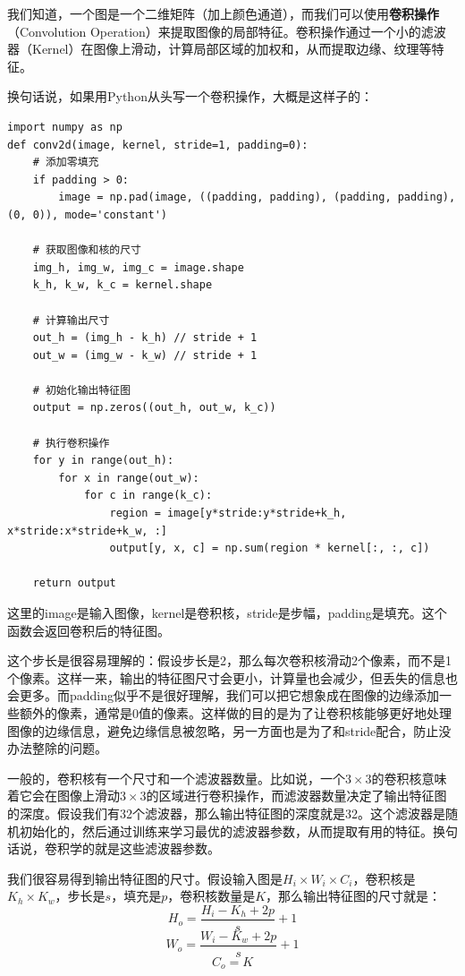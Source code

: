 我们知道，一个图是一个二维矩阵（加上颜色通道），而我们可以使用\textbf{卷积操作}（Convolution Operation）来提取图像的局部特征。卷积操作通过一个小的滤波器（Kernel）在图像上滑动，计算局部区域的加权和，从而提取边缘、纹理等特征。

换句话说，如果用Python从头写一个卷积操作，大概是这样子的：
\begin{verbatim}
import numpy as np
def conv2d(image, kernel, stride=1, padding=0):
    # 添加零填充
    if padding > 0:
        image = np.pad(image, ((padding, padding), (padding, padding), (0, 0)), mode='constant')

    # 获取图像和核的尺寸
    img_h, img_w, img_c = image.shape
    k_h, k_w, k_c = kernel.shape

    # 计算输出尺寸
    out_h = (img_h - k_h) // stride + 1
    out_w = (img_w - k_w) // stride + 1

    # 初始化输出特征图
    output = np.zeros((out_h, out_w, k_c))

    # 执行卷积操作
    for y in range(out_h):
        for x in range(out_w):
            for c in range(k_c):
                region = image[y*stride:y*stride+k_h, x*stride:x*stride+k_w, :]
                output[y, x, c] = np.sum(region * kernel[:, :, c])
    
    return output
\end{verbatim}

这里的image是输入图像，kernel是卷积核，stride是步幅，padding是填充。这个函数会返回卷积后的特征图。

这个步长是很容易理解的：假设步长是2，那么每次卷积核滑动2个像素，而不是1个像素。这样一来，输出的特征图尺寸会更小，计算量也会减少，但丢失的信息也会更多。而padding似乎不是很好理解，我们可以把它想象成在图像的边缘添加一些额外的像素，通常是0值的像素。这样做的目的是为了让卷积核能够更好地处理图像的边缘信息，避免边缘信息被忽略，另一方面也是为了和stride配合，防止没办法整除的问题。

一般的，卷积核有一个尺寸和一个滤波器数量。比如说，一个$3\times 3$的卷积核意味着它会在图像上滑动$3\times 3$的区域进行卷积操作，而滤波器数量决定了输出特征图的深度。假设我们有32个滤波器，那么输出特征图的深度就是32。这个滤波器是随机初始化的，然后通过训练来学习最优的滤波器参数，从而提取有用的特征。换句话说，卷积学的就是这些滤波器参数。

我们很容易得到输出特征图的尺寸。假设输入图是$H_i \times W_i \times C_i$，卷积核是$K_h \times K_w$，步长是$s$，填充是$p$，卷积核数量是$K$，那么输出特征图的尺寸就是：
\[H_o = \frac{H_i - K_h + 2p}{s} + 1\]
\[W_o = \frac{W_i - K_w + 2p}{s} + 1\]
\[C_o = K\]


